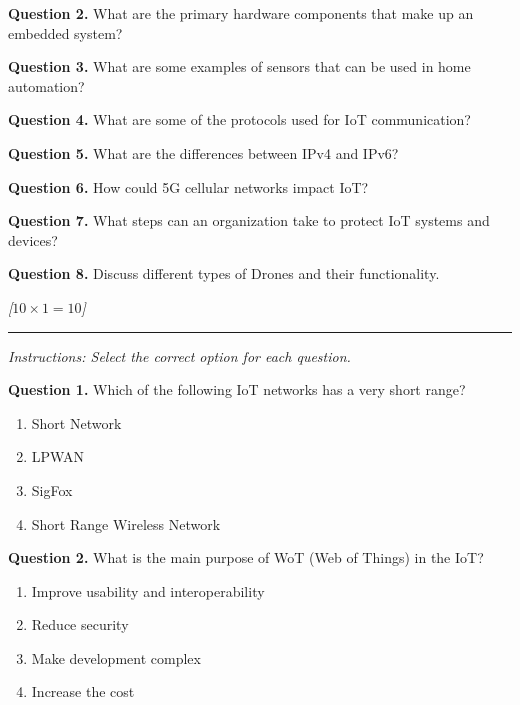 \documentclass[11pt,a4paper]{article}
\newcommand{\pts}[1]{\hfill   \textit{[#1]}}
\begin{document}
\medskip


\noindent   \textbf{Question 2.} What are the primary hardware components that make up an embedded system?

\medskip


\noindent   \textbf{Question 3.} What are some examples of sensors that can be used in home automation?

\medskip


\noindent   \textbf{Question 4.} What are some of the protocols used for IoT communication?

\medskip


\noindent   \textbf{Question 5.} What are the differences between IPv4 and IPv6?

\medskip


\noindent   \textbf{Question 6.} How could 5G cellular networks impact IoT?

\medskip


\noindent   \textbf{Question 7.} What steps can an organization take to protect IoT systems and devices?

\medskip


\noindent   \textbf{Question 8.} Discuss different types of Drones and their functionality.

\bigskip


\pts{$10  \times 1 = 10$}
\rule{\linewidth}{0.4pt}\smallskip




\noindent   \textit{Instructions: Select the correct option for each question.}

\medskip


\noindent   \textbf{Question 1.} Which of the following IoT networks has a very short range?

\begin{enumerate}[label=(\alph*),itemsep=2pt]
  \item Short Network
  \item LPWAN
  \item SigFox
  \item Short Range Wireless Network
\end{enumerate}

\medskip


\noindent   \textbf{Question 2.} What is the main purpose of WoT (Web of Things) in the IoT?

\begin{enumerate}[label=(\alph*),itemsep=2pt]
  \item Improve usability and interoperability
  \item Reduce security
  \item Make development complex
  \item Increase the cost
\end{enumerate}
\end{document}
